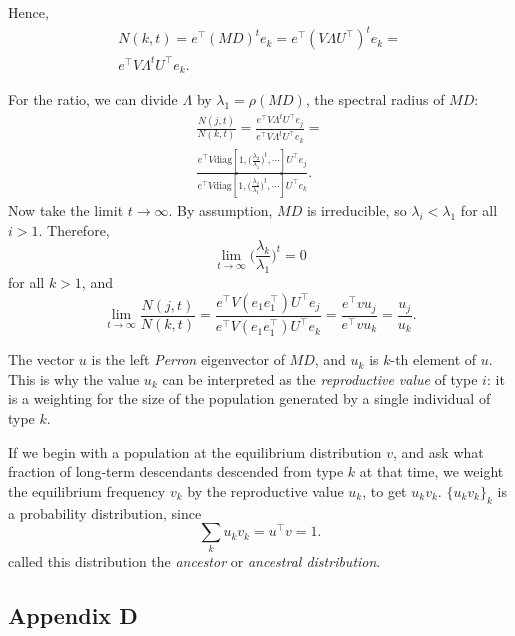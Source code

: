 \documentclass[9pt, a4paper, twocolumn]{extarticle}
\newcommand*{\tr}{^\intercal}
\newcommand{\matrx}[1]{{\left[ \stackrel{}{#1}\right]}}
\newcommand{\diag}[1]{\mbox{diag}\matrx{#1}}
\newcommand{\goesto}{\rightarrow}
\begin{document}
Hence,
\begin{multline}
N(k, t) = 
e\tr (MD)^t e_k =
e\tr  (V \Lambda U\tr)^t e_k = \\
e\tr V \Lambda^t U\tr e_k.
\end{multline}

For the ratio, we can divide $\Lambda$ by $\lambda_1 = \rho(MD)$,
the spectral radius of $MD$:
\begin{multline}
\frac{N(j,t)}{N(k,t)} =
\frac{ e\tr V \Lambda^t U\tr e_j}{ e\tr V \Lambda^t U\tr e_k} = \\
\frac{ e\tr V \diag{1, \Big(\frac{\lambda_2}{\lambda_1}\Big)^t, \cdots} U\tr e_j} { e\tr V \diag{1,\Big(\frac{\lambda_2}{\lambda_1}\Big)^t, \cdots} U\tr e_k}.
\end{multline}
Now take the limit $t \goesto \infty$.
By assumption, $MD$ is irreducible, so $\lambda_i < \lambda_1$ for all $i > 1$.
Therefore,
\begin{equation}
\lim_{t \goesto \infty} \Big( \frac{\lambda_k}{\lambda_1} \Big)^t = 0
\end{equation}
for all $k > 1$, and
\begin{equation}
\lim_{t \goesto \infty}\frac{N(j,t)}{N(k,t)} =
\frac{e\tr V (e_1 e_1\tr) U\tr e_j} { e\tr V (e_1 e_1\tr) U\tr e_k} = 
\frac{ e\tr v u_j} { e\tr v  u_k} =
\frac{u_j} {u_k}.
\end{equation}

The vector $u$ is the left \emph{Perron} eigenvector of $MD$, and $u_k$ is $k$-th element of $u$.
This is why the value $u_k$ can be interpreted as the \emph{reproductive value} of type $i$: it is a weighting for the size of the population generated by a single individual of type $k$.

If we begin with a population at the equilibrium distribution $v$,
and ask what fraction of long-term descendants descended from type $k$ at that time,
we weight the equilibrium frequency $v_k$ by the reproductive value $u_k$, to get $u_k v_k$.
$\{u_k v_k\}_{k}$ is a probability distribution, since
\begin{equation}
\sum_k {u_k v_k} = u\tr v = 1.
\end{equation}
\citet{Hermisson2002} called this distribution the \emph{ancestor} or \emph{ancestral distribution}.

\subsection*{Appendix D}\label{sec:AppD}
\end{document}
